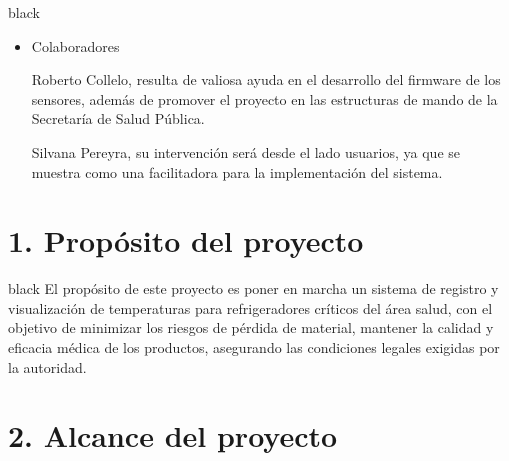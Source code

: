 \documentclass[11pt]{charter}
\begin{document}
\begin{consigna}{black}
 
\begin{itemize}
\item Colaboradores

Roberto Collelo, resulta de valiosa ayuda en el desarrollo del firmware de los sensores, además de promover el proyecto en las estructuras de mando de la Secretaría de Salud Pública.

Silvana Pereyra, su intervención será desde el lado usuarios, ya que se muestra como una facilitadora para la implementación del sistema.
\end{itemize}

\end{consigna}



\section{1. Propósito del proyecto}
\label{sec:proposito}

\begin{consigna}{black}
El propósito de este proyecto es poner en marcha un sistema de registro y visualización de temperaturas para refrigeradores críticos del área salud, con el objetivo de minimizar los riesgos de pérdida de material, mantener la calidad y eficacia médica de los productos, asegurando las condiciones legales exigidas por la autoridad.
\end{consigna}

\section{2. Alcance del proyecto}
\label{sec:alcance}
\end{document}
